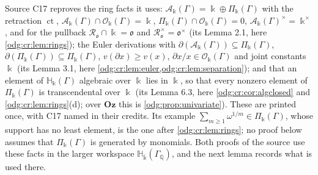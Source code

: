 \documentclass[11pt,oneside]{article}
\numberwithin{equation}{section}
\theoremstyle{definition}
\theoremstyle{remark}
\newcommand{\Oz}{\mathbf{Oz}}
\newcommand{\Q}{\mathbb Q}
\newcommand{\ct}{\operatorname{ct}}
\newcommand{\crH}{\mathbb H_\Bbbk(\Gamma)}
\newcommand{\crA}{\mathcal A_\Bbbk(\Gamma)}
\newcommand{\crP}{\Pi_\Bbbk(\Gamma)}
\newcommand{\crO}{\mathcal O_\Bbbk(\Gamma)}
\newcommand{\Hbar}{\mathbb H_{\bar\Bbbk}(\Gamma_\Q)}
\begin{document}
Source C17 reproves the ring facts it uses: $\crA=\Bbbk\oplus\crP$ with the retraction
$\ct$, $\crA\cap\crO=\Bbbk$, $\crP\cap\crO=0$, $\crA^\times=\Bbbk^\times$, and for the
pullback $\mathcal R_{\mathfrak o}\cap\Bbbk=\mathfrak o$ and
$\mathcal R_{\mathfrak o}^\times=\mathfrak o^\times$ (its Lemma 2.1, here
\cref{odg:cr:lem:rings}); the Euler derivations with $\partial(\crA)\subseteq\crP$,
$\partial(\crP)\subseteq\crP$, $v(\partial x)\ge v(x)$, $\partial x/x\in\crO$ and joint
constants $\Bbbk$ (its Lemma 3.1, here \cref{odg:cr:lem:euler,odg:cr:lem:separation});
and that an element of $\crH$ algebraic over $\Bbbk$ lies in $\Bbbk$, so that every nonzero
element of $\crP$ is transcendental over $\Bbbk$ (its Lemma 6.3, here
\cref{odg:cr:cor:algclosed} and \cref{odg:cr:lem:rings}(d); over $\Oz$ this is
\cref{odg:prop:univariate}). These are printed once, with C17 named in their credits. Its
example $\sum_{m\ge1}\omega^{1/m}\in\crP$, whose support has no least element, is the one
after \cref{odg:cr:lem:rings}; no proof below assumes that $\crP$ is generated by
monomials. Both proofs of the source use these facts in the larger workspace $\Hbar$, and
the next lemma records what is used there.
\end{document}
